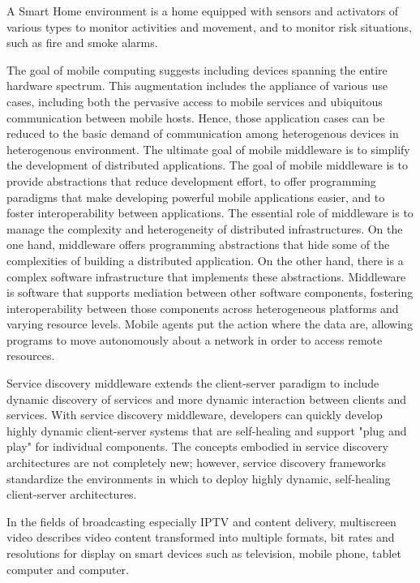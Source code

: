 \documentclass{sig-alternate}
\begin{document}
A Smart Home environment is a home equipped with sensors and activators of various types to monitor activities and movement, and to monitor risk situations, such as fire and smoke alarms. 

The goal of mobile computing suggests including devices spanning the entire hardware spectrum. This augmentation includes the appliance of various use cases,  including both the pervasive access to mobile services and ubiquitous communication between mobile hosts. Hence, those application cases can be reduced to the basic demand of communication among heterogenous devices in heterogenous environment.
The ultimate goal of mobile middleware is to simplify the development of distributed applications.
The goal of mobile middleware is to provide abstractions that reduce development effort, to offer programming paradigms that make developing powerful mobile applications easier, and to foster interoperability between applications.
The essential role of middleware is to manage the complexity and heterogeneity of distributed infrastructures. 
On the one hand, middleware offers programming abstractions that hide some of the complexities of building a distributed application.
On the other hand, there is a complex software infrastructure that implements these abstractions.
Middleware is software that supports mediation between other software components, fostering interoperability between those components across heterogeneous platforms and varying resource levels.
Mobile agents put the action where the data are, allowing programs to move autonomously about a network in order to access remote resources.

Service discovery middleware extends the client-server paradigm to include dynamic discovery of services and more dynamic interaction between clients and services.
With service discovery middleware, developers can quickly develop highly dynamic client-server systems that are self-healing and support "plug and play" for individual components.
The concepts embodied in service discovery architectures are not completely new; however, service discovery frameworks standardize the environments in which to deploy highly dynamic, self-healing client-server architectures.

In the fields of broadcasting especially IPTV and content delivery, multiscreen video describes video content transformed into multiple formats, bit rates and resolutions for display on smart devices such as television, mobile phone, tablet computer and computer.
\end{document}
